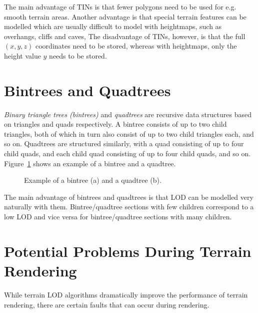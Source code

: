 The main advantage of TINs is that fewer polygons need to be used for 
e.g. smooth terrain areas. Another advantage is that
special terrain features can be modelled 
which are usually difficult to model with heightmaps, such as overhangs, cliffs and caves, 
The disadvantage of TINs, however, is that the full $(x,y,z)$ coordinates need to be stored,
whereas with heightmaps, only the height value $y$ needs to be stored.

\section{Bintrees and Quadtrees}
\textit{Binary triangle trees (bintrees)} and \textit{quadtrees} are 
recursive data structures based on triangles and quads respectively.
A bintree consists of up to two child triangles, both of which in turn also consist of up to two child triangles each, and so on.
Quadtrees are structured similarly, with a quad consisting of up to four child quads, and each child quad consisting
of up to four child quads, and so on.
Figure~\ref{fig:bintree-quadtree-example} shows an example of a bintree and a quadtree.

\begin{figure}[H]
  \centering
  \qquad
  \caption{Example of a bintree (a) and a quadtree (b).}\label{fig:bintree-quadtree-example}
\end{figure}

The main advantage of bintrees and quadtrees is that 
LOD can be modelled very naturally with them.
Bintree/quadtree sections with few children correspond to a low LOD and 
vice versa for bintree/quadtree sections with many children.

\section{Potential Problems During Terrain Rendering}
While terrain LOD algorithms dramatically improve the performance of terrain rendering, 
there are certain faults that can occur during rendering. 

